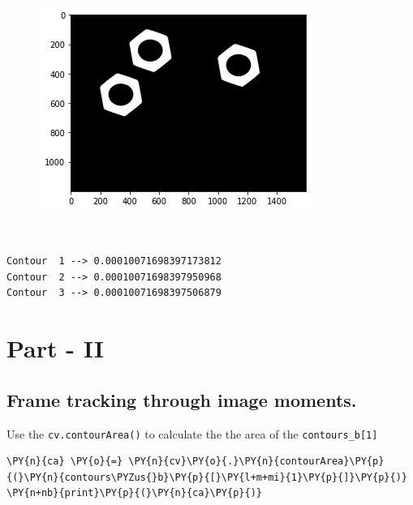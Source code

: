 \documentclass[a4paper,11pt]{article}%
\begin{document}
    \begin{figure}[!h]
		\centering
    \includegraphics[scale=0.7]{figures/output_14_0.png}
    \end{figure}
    { \hspace*{\fill} \\}

    \begin{Verbatim}[commandchars=\\\{\}]
Contour  1 --> 0.00010071698397173812
Contour  2 --> 0.00010071698397950968
Contour  3 --> 0.00010071698397506879
    \end{Verbatim}

    \hypertarget{part---ii}{%
\section{Part - II}\label{part---ii}}

\hypertarget{frame-tracking-through-image-moments.}{%
\subsection{Frame tracking through image
moments.}\label{frame-tracking-through-image-moments.}}

Use the \texttt{cv.contourArea()} to calculate the the area of the \texttt{contours\_b{[}1{]}}

    \begin{tcolorbox}[breakable, size=fbox, boxrule=1pt, pad at break*=1mm,colback=cellbackground, colframe=cellborder]
\begin{Verbatim}[commandchars=\\\{\}]
\PY{n}{ca} \PY{o}{=} \PY{n}{cv}\PY{o}{.}\PY{n}{contourArea}\PY{p}{(}\PY{n}{contours\PYZus{}b}\PY{p}{[}\PY{l+m+mi}{1}\PY{p}{]}\PY{p}{)}
\PY{n+nb}{print}\PY{p}{(}\PY{n}{ca}\PY{p}{)}
\end{Verbatim}
\end{tcolorbox}
\end{document}
